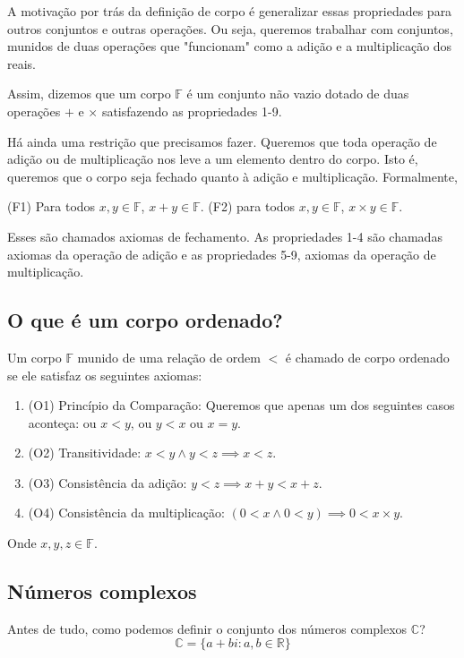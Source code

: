 \documentclass[12pt,a4paper]{article}
\begin{document}
A motivação por trás da definição de corpo é generalizar essas propriedades para outros conjuntos e outras operações. Ou seja, queremos trabalhar com conjuntos, munidos de duas operações que "funcionam" como a adição e a multiplicação dos reais.

Assim, dizemos que um corpo $\mathbb{F}$ é um conjunto não vazio dotado de duas operações $+$ e $\times$ satisfazendo as propriedades 1-9.

Há ainda uma restrição que precisamos fazer. Queremos que toda operação de adição ou de multiplicação nos leve a um elemento dentro do corpo. Isto é, queremos que o corpo seja fechado quanto à adição e multiplicação. Formalmente,

(F1) Para todos $x,y \in \mathbb{F}$, $x+y \in \mathbb{F}$.
(F2) para todos $x,y \in \mathbb{F}$, $x \times y \in \mathbb{F}$.

Esses são chamados axiomas de fechamento. As propriedades 1-4 são chamadas axiomas da operação de adição e as propriedades 5-9, axiomas da operação de multiplicação.

\subsection{O que é um corpo ordenado?}

Um corpo $\mathbb{F}$ munido de uma relação de ordem $<$ é chamado de corpo ordenado se ele satisfaz os seguintes axiomas:

\begin{enumerate}
\item (O1) Princípio da Comparação: Queremos que apenas um dos seguintes casos aconteça: ou $x<y$, ou $y<x$ ou $x=y$.
\item (O2) Transitividade: $x < y \land y < z \implies x < z$.
\item (O3) Consistência da adição: $y < z \implies x+y < x + z$.
\item (O4) Consistência da multiplicação: $(0 < x \land 0 < y) \implies 0 < x \times y$.
\end{enumerate}

Onde $x, y, z \in \mathbb{F}$.

\subsection{Números complexos}

Antes de tudo, como podemos definir o conjunto dos números complexos $\mathbb{C}$?
$$
\mathbb{C} = \{ a+bi : a, b \in \mathbb{R} \}
$$
\end{document}
